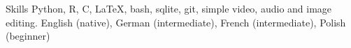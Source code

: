
\begin{rubric}{Skills}
	Python, R, C, \LaTeX, bash, {\sc sqlite}, git, simple video, audio and image editing.
    English (native), German (intermediate), French (intermediate), Polish (beginner)
\end{rubric}
